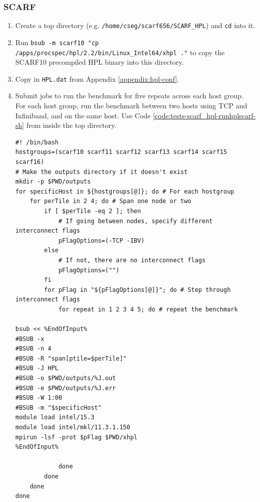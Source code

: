 \documentclass{article}
\newenvironment{code}{\captionsetup{type=listing}}{}
\begin{document}
        \subsubsection{SCARF}
        \label{running-HPL-SCARF}
        \begin{enumerate}
            \item Create a top directory (e.g. \verb|/home/cseg/scarf656/SCARF_HPL|) and \verb|cd| into it.
            \item Run \texttt{bsub -m scarf10 "cp /apps/procspec/hpl/2.2/bin/Linux_Intel64/xhpl ."} to copy the SCARF10 precompiled HPL binary into this directory.
            \item Copy in \verb|HPL.dat| from Appendix \ref{appendix:hpl-conf}.
            \item Submit jobs to run the benchmark for five repeats across each host group. For each host group, run the benchmark between two hosts using TCP and Infiniband, and on the same host. Use Code \ref{code:tests-scarf_hpl-runhplscarf-sh} from inside the top directory.


            \begin{code}
            \label{code:tests-scarf_hpl-runhplscarf-sh}

            \begin{verbatim}
#! /bin/bash
hostgroups=(scarf10 scarf11 scarf12 scarf13 scarf14 scarf15 scarf16)
# Make the outputs directory if it doesn't exist
mkdir -p $PWD/outputs
for specificHost in ${hostgroups[@]}; do # For each hostgroup
    for perTile in 2 4; do # Span one node or two
        if [ $perTile -eq 2 ]; then
            # If going between nodes, specify different interconnect flags
            pFlagOptions=(-TCP -IBV)
        else
            # If not, there are no interconnect flags
            pFlagOptions=("")
        fi
	    for pFlag in "${pFlagOptions[@]}"; do # Step through interconnect flags
            for repeat in 1 2 3 4 5; do # repeat the benchmark

bsub << %EndOfInput%
#BSUB -x
#BSUB -n 4
#BSUB -R "span[ptile=$perTile]"
#BSUB -J HPL
#BSUB -o $PWD/outputs/%J.out
#BSUB -e $PWD/outputs/%J.err
#BSUB -W 1:00
#BSUB -m "$specificHost"
module load intel/15.3
module load intel/mkl/11.3.1.150
mpirun -lsf -prot $pFlag $PWD/xhpl
%EndOfInput%

            done
        done
    done
done
            \end{verbatim}
            \end{code}
        \end{enumerate}
\end{document}
